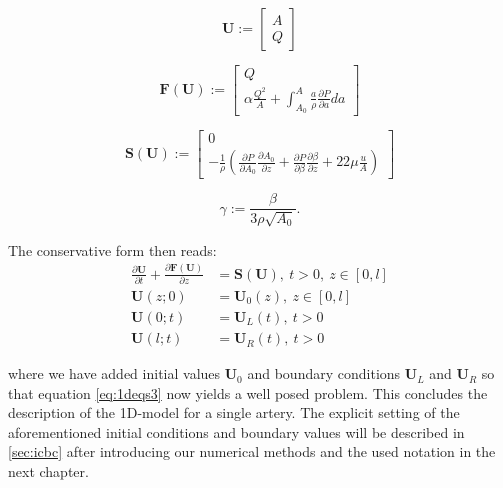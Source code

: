 \documentclass[a4paper, oneside]{discothesis}
\begin{document}
\begin{equation}
	\mathbf{U} := 
		\begin{bmatrix}
			A \\
			Q
		\end{bmatrix}
\end{equation}

\begin{equation}
	\mathbf{F} \left( \mathbf{U} \right) := 
		\begin{bmatrix}
			Q \\
			\alpha \frac{Q^2}{A} + \int_{A_0}^{A} \frac{a}{\rho}\frac{\partial P}{\partial a} da
		\end{bmatrix}
\end{equation}

\begin{equation}
	\mathbf{S} \left( \mathbf{U} \right) := 
		\begin{bmatrix}
			0 \\
			-\frac{1}{\rho} \left( \frac{\partial P}{\partial A_0} \frac{\partial A_0}{\partial z} + \frac{\partial P}{\partial \beta} \frac{\partial \beta}{\partial z} + 22\mu\frac{u}{A} \right)
		\end{bmatrix}
\end{equation}

\begin{equation}
	\gamma := \frac{\beta}{3\rho\sqrt{A_0}}.
\end{equation}


The conservative form then reads:
\begin{equation}
	\begin{aligned}
		\frac{\partial \mathbf{U}}{\partial t} + \frac{\partial \mathbf{F} \left( \mathbf{U} \right)}{\partial z} &= \mathbf{S} \left( \mathbf{U} \right), \ t>0, \ z \in \left[ 0,l \right] \\
		\mathbf{U} \left( z;0 \right) &= \mathbf{U}_0 \left( z \right), \ z \in \left[ 0,l \right] \\
	\mathbf{U} \left( 0;t \right) &= \mathbf{U}_L \left( t \right), \ t>0\\
\mathbf{U} \left( l;t \right) &= \mathbf{U}_R \left( t \right), \ t>0
	\end{aligned} \label{eq:1deqs3}
\end{equation}

where we have added initial values $\mathbf{U}_0$ and boundary conditions $\mathbf{U}_L$ and $\mathbf{U}_R$ so that equation \ref{eq:1deqs3} now yields a well posed problem.\cite{formaggia2010cardiovascular}
This concludes the description of the 1D-model for a single artery.
The explicit setting of the aforementioned initial conditions and boundary values will be described in \autoref{sec:icbc} after introducing our numerical methods and the used notation in the next chapter.
\end{document}

